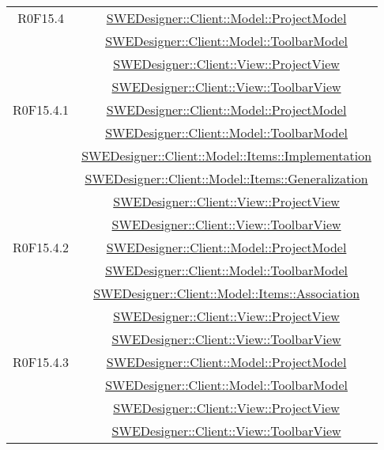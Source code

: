 \documentclass[../DefinizioneDiProdotto.tex]{subfiles}
\begin{document}
\begin{longtable}{|c|c|}
				R0F15.4
				& \hyperlink{SWEDesigner::Client::Model::ProjectModel}{SWEDesigner::Client::Model::ProjectModel}\\
				& \hyperlink{SWEDesigner::Client::Model::ToolbarModel}{SWEDesigner::Client::Model::ToolbarModel}\\
				& \hyperlink{SWEDesigner::Client::View::ProjectView}{SWEDesigner::Client::View::ProjectView}\\
				& \hyperlink{SWEDesigner::Client::View::ToolbarView}{SWEDesigner::Client::View::ToolbarView}\\
				\hline

				R0F15.4.1
				& \hyperlink{SWEDesigner::Client::Model::ProjectModel}{SWEDesigner::Client::Model::ProjectModel}\\
				& \hyperlink{SWEDesigner::Client::Model::ToolbarModel}{SWEDesigner::Client::Model::ToolbarModel}\\
				& \hyperlink{SWEDesigner::Client::Model::Items::Implementation}{SWEDesigner::Client::Model::Items::Implementation}\\
				& \hyperlink{SWEDesigner::Client::Model::Items::Generalization}{SWEDesigner::Client::Model::Items::Generalization}\\
				& \hyperlink{SWEDesigner::Client::View::ProjectView}{SWEDesigner::Client::View::ProjectView}\\
				& \hyperlink{SWEDesigner::Client::View::ToolbarView}{SWEDesigner::Client::View::ToolbarView}\\
				\hline

				R0F15.4.2
				& \hyperlink{SWEDesigner::Client::Model::ProjectModel}{SWEDesigner::Client::Model::ProjectModel}\\
				& \hyperlink{SWEDesigner::Client::Model::ToolbarModel}{SWEDesigner::Client::Model::ToolbarModel}\\
				& \hyperlink{SWEDesigner::Client::Model::Items::Association}{SWEDesigner::Client::Model::Items::Association}\\
				& \hyperlink{SWEDesigner::Client::View::ProjectView}{SWEDesigner::Client::View::ProjectView}\\
				& \hyperlink{SWEDesigner::Client::View::ToolbarView}{SWEDesigner::Client::View::ToolbarView}\\
				\hline

				R0F15.4.3
				& \hyperlink{SWEDesigner::Client::Model::ProjectModel}{SWEDesigner::Client::Model::ProjectModel}\\
				& \hyperlink{SWEDesigner::Client::Model::ToolbarModel}{SWEDesigner::Client::Model::ToolbarModel}\\
				& \hyperlink{SWEDesigner::Client::View::ProjectView}{SWEDesigner::Client::View::ProjectView}\\
				& \hyperlink{SWEDesigner::Client::View::ToolbarView}{SWEDesigner::Client::View::ToolbarView}\\
				\hline


\end{longtable}
\end{document}
